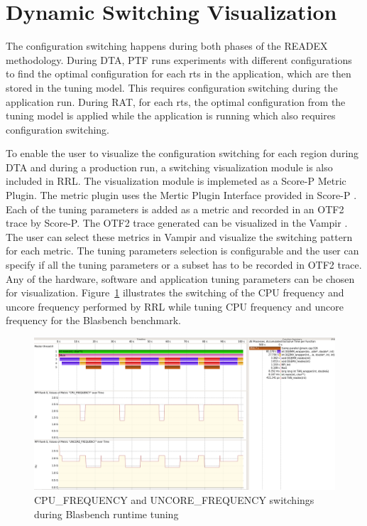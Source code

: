 \section{Dynamic Switching Visualization} \label{switching-visualization}
The configuration switching happens during both phases of the READEX methodology. 
During DTA, PTF runs experiments with different configurations to find the optimal configuration for each rts in the application, which are then stored in the tuning model. 
This requires configuration switching during the application run. 
During RAT, for each rts, the optimal configuration from the tuning model is applied while the application is running which also requires configuration switching.

To enable the user to visualize the configuration switching for each region during DTA and during a production run, a switching visualization module is also included in RRL. 
The visualization module is implemeted as a Score-P Metric Plugin. 
The metric plugin uses the Mertic Plugin Interface provided in Score-P \cite{Schoene2017}. 
Each of the tuning parameters is added as a metric and recorded in an OTF2 \cite{Ilsche-Cstate} trace by Score-P. 
The OTF2 trace generated can be visualized in the Vampir \cite{BHJR:10:VampirOverview}. 
The user can select these metrics in Vampir and visualize the switching pattern for each metric.
The tuning parameters selection is configurable and the user can specify if all the tuning parameters or a subset has to be recorded in OTF2 trace. 
Any of the hardware, software and application tuning parameters can be chosen for visualization.
Figure~\ref{fig:switch_visualization} illustrates the switching of the CPU frequency and uncore frequency performed by
RRL while tuning CPU frequency and uncore frequency for the Blasbench benchmark.
\begin{figure}[!t]
\centering
\includegraphics[width=.95\columnwidth]{figures/visualization_trace.png}
\caption{{CPU\_FREQUENCY} and {UNCORE\_FREQUENCY} switchings during Blasbench runtime tuning}
\label{fig:switch_visualization}
\end{figure}

 